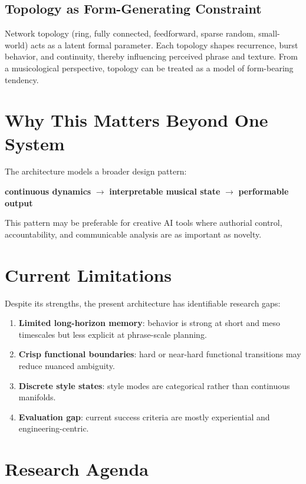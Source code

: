 \documentclass[11pt,a4paper]{article}
\begin{document}
\subsection{Topology as Form-Generating Constraint}

Network topology (ring, fully connected, feedforward, sparse random, small-world) acts as a latent formal parameter.
Each topology shapes recurrence, burst behavior, and continuity, thereby influencing perceived phrase and texture.
From a musicological perspective, topology can be treated as a model of form-bearing tendency.

\section{Why This Matters Beyond One System}

The architecture models a broader design pattern:
\begin{center}
\textbf{continuous dynamics} $\rightarrow$ \textbf{interpretable musical state} $\rightarrow$ \textbf{performable output}
\end{center}

This pattern may be preferable for creative AI tools where authorial control, accountability,
and communicable analysis are as important as novelty.

\section{Current Limitations}

Despite its strengths, the present architecture has identifiable research gaps:
\begin{enumerate}[label=\arabic*.]
    \item \textbf{Limited long-horizon memory}: behavior is strong at short and meso timescales but less explicit at phrase-scale planning.
    \item \textbf{Crisp functional boundaries}: hard or near-hard functional transitions may reduce nuanced ambiguity.
    \item \textbf{Discrete style states}: style modes are categorical rather than continuous manifolds.
    \item \textbf{Evaluation gap}: current success criteria are mostly experiential and engineering-centric.
\end{enumerate}

\section{Research Agenda}
\end{document}
